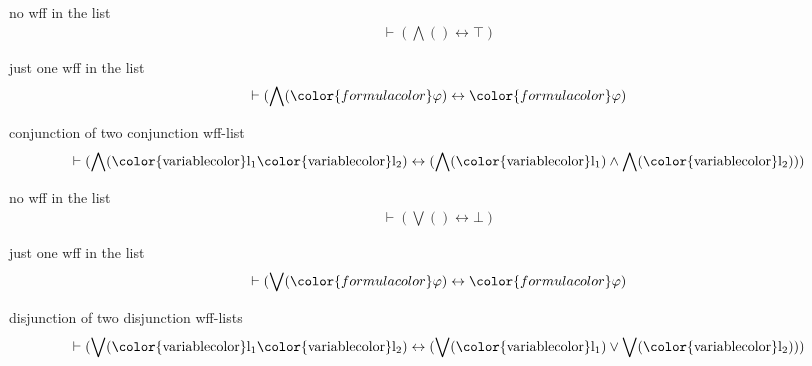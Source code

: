 \begin{lemma} no wff in the list
\begin{align}
\vdash ( \bigwedge( ) \leftrightarrow \top )\label{df-lan0}
\end{align}
\end{lemma}

\begin{lemma} just one wff in the list
\begin{align}
\vdash ( \bigwedge( {\color{formulacolor}\varphi} ) \leftrightarrow
    {\color{formulacolor}\varphi} )\label{df-lan1}
\end{align}
\end{lemma}

\begin{lemma} conjunction of two conjunction wff-list
\begin{align}
\vdash ( \bigwedge( {\rm\color{variablecolor}l_1} {\rm\color{variablecolor}l_2}
    ) \leftrightarrow ( \bigwedge( {\rm\color{variablecolor}l_1} ) \wedge
    \bigwedge( {\rm\color{variablecolor}l_2} ) ) )\label{df-lan2wl}
\end{align}
\end{lemma}

\begin{lemma} no wff in the list
\begin{align}
\vdash ( \bigvee( ) \leftrightarrow \bot )\label{df-lor0}
\end{align}
\end{lemma}

\begin{lemma} just one wff in the list
\begin{align}
\vdash ( \bigvee( {\color{formulacolor}\varphi} ) \leftrightarrow
    {\color{formulacolor}\varphi} )\label{df-lor1}
\end{align}
\end{lemma}

\begin{lemma} disjunction of two disjunction wff-lists
\begin{align}
\vdash ( \bigvee( {\rm\color{variablecolor}l_1} {\rm\color{variablecolor}l_2} )
    \leftrightarrow ( \bigvee( {\rm\color{variablecolor}l_1} ) \vee \bigvee(
    {\rm\color{variablecolor}l_2} ) ) )\label{df-lor2wl}
\end{align}
\end{lemma}

